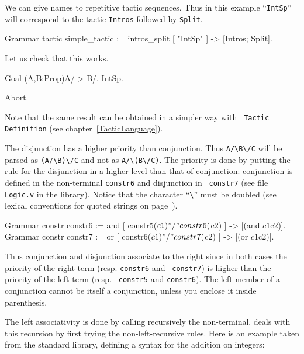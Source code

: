{

We can give names to repetitive tactic sequences. Thus in this example
``{\tt IntSp}'' will correspond to the tactic {\tt Intros} followed by
{\tt Split}.

\begin{coq_example}
Grammar tactic simple_tactic :=
  intros_split [ "IntSp" ] -> [Intros; Split].
\end{coq_example}

Let us check that this works.

\begin{coq_example}
Goal (A,B:Prop)A/\B -> B/\A.
IntSp.
\end{coq_example}
\begin{coq_eval}
Abort.
\end{coq_eval}

Note that the same result can be obtained in a simpler way with {\tt
Tactic Definition} (see chapter~\ref{TacticLanguage}).


The disjunction has a higher priority than conjunction.  Thus
\verb+A/\B\/C+ will be parsed as \verb+(A/\B)\/C+ and not as
\verb+A/\(B\/C)+. The priority is done by putting the rule for the
disjunction in a higher level than that of conjunction: conjunction is
defined in the non-terminal {\tt constr6} and disjunction in {\tt
constr7} (see file {\tt Logic.v} in the library). Notice that
the character ``\verb+\+'' must be doubled (see lexical conventions
for quoted strings on page~\pageref{lexical}).

\begin{coq_example*}
Grammar constr constr6 := 
  and [ constr5($c1) "/\\" constr6($c2) ] -> [(and $c1 $c2)].
Grammar constr constr7 :=
  or  [ constr6($c1) "\\/" constr7($c2) ] -> [(or $c1 $c2)].
\end{coq_example*}

Thus conjunction and disjunction associate to the right since in both
cases the priority of the right term (resp. {\tt constr6} and {\tt
constr7}) is higher than the priority of the left term (resp. {\tt
constr5} and {\tt constr6}). The left member of a conjunction cannot
be itself a conjunction, unless you enclose it inside parenthesis.

The left associativity is done by calling recursively the
non-terminal. {\camlpppp} deals with this recursion by first trying
the non-left-recursive rules. Here is an example taken from the
standard library, defining a syntax for the addition on integers:

}
